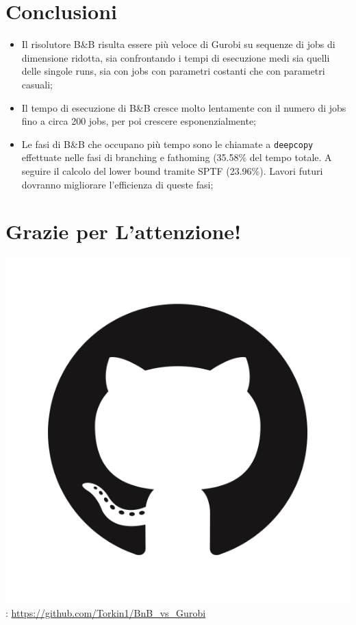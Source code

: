 \documentclass[compress]{beamer}
\begin{document}
\section{Conclusioni}
    \begin{frame}{\secname}
        \begin{itemize}
            \item Il risolutore B\&B risulta essere più veloce di Gurobi su sequenze
            di jobs di dimensione ridotta, sia confrontando i tempi di esecuzione medi sia quelli delle
            singole runs, sia con jobs con parametri costanti che con parametri casuali;
            \item Il tempo di esecuzione di B\&B cresce molto lentamente con il numero di jobs fino a
            circa 200 jobs, per poi crescere esponenzialmente;
            \item Le fasi di B\&B che occupano più tempo sono le chiamate a \texttt{deepcopy}
            effettuate nelle fasi di branching e fathoming (35.58\% del tempo totale. A seguire
            il calcolo del lower bound tramite SPTF (23.96\%). Lavori futuri dovranno migliorare
            l'efficienza di queste fasi;

        \end{itemize}
    \end{frame}

\section{Grazie per L'attenzione!}

\begin{frame}{\secname}
    \includegraphics[scale=0.03]{figs/GitHub-Mark.png}: \url{https://github.com/Torkin1/BnB_vs_Gurobi}
\end{frame}
\end{document}
